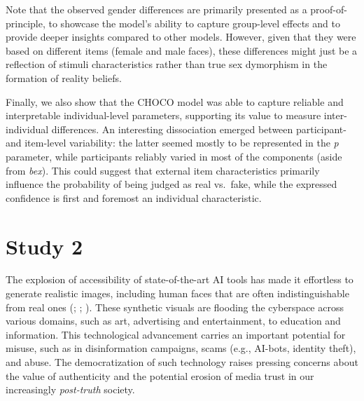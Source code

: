 \documentclass[
  jou,
  floatsintext,
  longtable,
  nolmodern,
  notxfonts,
  notimes,
  colorlinks=true,linkcolor=blue,citecolor=blue,urlcolor=blue]{apa7}
\begin{document}
Note that the observed gender differences are primarily presented as a
proof-of-principle, to showcase the model's ability to capture
group-level effects and to provide deeper insights compared to other
models. However, given that they were based on different items (female
and male faces), these differences might just be a reflection of stimuli
characteristics rather than true sex dymorphism in the formation of
reality beliefs.

Finally, we also show that the CHOCO model was able to capture reliable
and interpretable individual-level parameters, supporting its value to
measure inter-individual differences. An interesting dissociation
emerged between participant- and item-level variability: the latter
seemed mostly to be represented in the \emph{p} parameter, while
participants reliably varied in most of the components (aside from
\emph{bex}). This could suggest that external item characteristics
primarily influence the probability of being judged as real vs.~fake,
while the expressed confidence is first and foremost an individual
characteristic.

\section{Study 2}\label{study-2}

The explosion of accessibility of state-of-the-art AI tools has made it
effortless to generate realistic images, including human faces that are
often indistinguishable from real ones
(;
;
). These
synthetic visuals are flooding the cyberspace across various domains,
such as art, advertising and entertainment, to education and
information. This technological advancement carries an important
potential for misuse, such as in disinformation campaigns, scams (e.g.,
AI-bots, identity theft), and abuse. The democratization of such
technology raises pressing concerns about the value of authenticity and
the potential erosion of media trust in our increasingly
\emph{post-truth} society.
\end{document}
